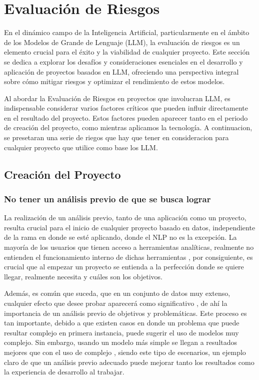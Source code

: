 
\chapter{Evaluación de Riesgos}

En el dinámico campo de la Inteligencia Artificial, particularmente en el ámbito de los Modelos de Grande de Lenguaje (LLM), 
la evaluación de riesgos es un elemento crucial para el éxito y la viabilidad de cualquier proyecto. Este sección se dedica 
a explorar los desafíos y consideraciones esenciales en el desarrollo y aplicación de proyectos basados en LLM, ofreciendo 
una perspectiva integral sobre cómo mitigar riesgos y optimizar el rendimiento de estos modelos.

Al abordar la Evaluación de Riesgos en proyectos que involucran LLM, es indispensable considerar varios factores críticos 
que pueden influir directamente en el resultado del proyecto. Estos factores pueden aparecer tanto en el periodo de creación
del proyecto, como mientras aplicamos la tecnología. A continuacion, se presetaran una serie de riegos que hay que tener en 
consideracion para cualquier proyecto que utilice como base los LLM.

\section{Creación del Proyecto}

\subsection{No tener un análisis previo de que se busca lograr}

La realización de un análisis previo, tanto de una aplicación como un proyecto, resulta crucial para el inicio de cualquier 
proyecto basado en datos, independiente de la rama en donde se esté aplicando, donde el NLP no es la excepción. 
La mayoría de los usuarios que tienen acceso a herramientas analíticas, realmente no entienden el funcionamiento interno de dichas herramientas \cite{datos1}, 
por consiguiente, es crucial que al empezar un proyecto se entienda a la perfección donde se quiere llegar, realmente necesita y cuáles son los objetivos. 

Además, es común que suceda, que en un conjunto de datos muy extenso, cualquier efecto que desee probar aparecerá como significativo \cite{datos1}, de ahí la 
importancia de un análisis previo de objetivos y problemáticas. Este proceso es tan importante, debido a que existen casos en donde un problema que puede resultar complejo en 
primera instancia, puede sugerir el uso de modelos muy complejo. Sin embargo, usando un modelo más simple se llegan a resultados mejores 
que con el uso de complejo \cite{datos2}, siendo este tipo de escenarios, un ejemplo claro de que un análisis previo adecuado puede mejorar tanto los resultados como la 
experiencia de desarrollo al trabajar. 

